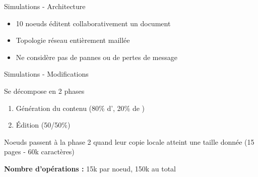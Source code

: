\begin{frame}{Simulations - Architecture}
\begin{figure}
{
    }
  \end{figure}
  \begin{itemize}
    \item \alert{10 noeuds} éditent collaborativement un document
    \item Topologie \alert{réseau entièrement maillée}
    \item Ne considère \alert{pas de pannes ou de pertes de message}
  \end{itemize}
\end{frame}

\begin{frame}{Simulations - Modifications}
  \begin{block}{Se décompose en 2 phases}
    \begin{enumerate}
      \item \alert{Génération du contenu} (80\% d'\ins, 20\% de \rmv)
      \item \alert{Édition} (50/50\%)
    \end{enumerate}
    Noeuds passent à la phase 2 quand leur copie locale atteint une taille donnée (15 pages - 60k caractères)
  \end{block}
  \pause
  \textbf{Nombre d'opérations : } 15k par noeud, 150k au total
\end{frame}

